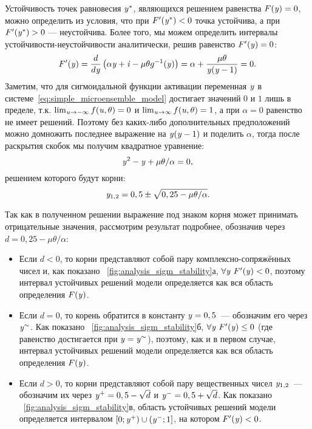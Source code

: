 Устойчивость точек равновесия $\mathit{y}^{*}$, являющихся решением равенства $F(\mathit{y}) = 0$, можно определить из условия, что при $F^{\prime}(\mathit{y}^{*}) < 0$ точка устойчива, а при $F^{\prime}(\mathit{y}^{*}) > 0$ --- неустойчива. Более того, мы можем определить интервалы устойчивости-неустойчивости аналитически, решив равенство $F^{\prime}(\mathit{y}) = 0$:
\begin{equation}
    \nonumber
    F^{\prime}(\mathit{y}) 
    = \dfrac{d}{d\mathit{y}}\left( \alpha \mathit{y} + \mathit{i} - \mu \theta g^{-1}(\mathit{y}) \right) 
    = \alpha + \dfrac{\mu \theta}{\mathit{y}(\mathit{y} - 1)}
    = 0.
\end{equation}
Заметим, что для сигмоидальной функции активации переменная $\mathit{y}$ в системе~\eqref{eq:simple_microensemble_model} достигает значений $0$ и $1$ лишь в пределе, т.к. $\lim_{\mathit{u} \to -\infty} f(\mathit{u}, \theta) = 0$ и $\lim_{\mathit{u} \to \infty} f(\mathit{u}, \theta) = 1$, а при $\alpha = 0$ равенство не имеет решений. Поэтому без каких-либо дополнительных предположений можно домножить последнее выражение на $\mathit{y}(\mathit{y} - 1)$ и поделить $\alpha$, тогда после раскрытия скобок мы получим квадратное уравнение:
\begin{equation}
    \nonumber
    \mathit{y}^{2} - \mathit{y} + \mu \theta / \alpha = 0,
\end{equation}
решением которого будут корни:
\begin{equation}
    \label{eq:sigm_stability_bounds_y}
    \mathit{y}_{1,2} = 0,5 \pm \sqrt{0,25 - \mu \theta / \alpha}.
\end{equation}

Так как в полученном решении выражение под знаком корня может принимать отрицательные значения, рассмотрим результат подробнее, обозначив через $d = 0,25 - \mu \theta / \alpha$:
\begin{itemize}
    \item Если $d < 0$, то корни представляют собой пару комплексно-сопряжённых чисел и, как показано \onfigure~\ref{fig:analysis_sigm_stability}а, $\forall\mathit{y}\ F^{\prime}(\mathit{y}) < 0$, поэтому интервал устойчивых решений модели определяется как вся область определения $F(\mathit{y})$.
    \item Если $d = 0$, то корень обратится в константу $\mathit{y} = 0,5$~--- обозначим его через $\mathit{y}^{\sim}$. Как показано \onfigure~\ref{fig:analysis_sigm_stability}б, $\forall\mathit{y}\ F^{\prime}(\mathit{y}) \le 0$ (где равенство достигается при $\mathit{y} = \mathit{y}^{\sim}$), поэтому, как и в первом случае, интервал устойчивых решений модели определяется как вся область определения $F(\mathit{y})$.
    \item Если $d > 0$, то корни представляют собой пару вещественных чисел $\mathit{y}_{1,2}$~--- обозначим их через $\mathit{y}^{+} = 0,5 - \sqrt{d}$ и $\mathit{y}^{-} = 0,5 + \sqrt{d}$. Как показано \onfigure~\ref{fig:analysis_sigm_stability}в, область устойчивых решений модели определяется интервалом $\left[0; \mathit{y}^{+}\right) \cup \left(\mathit{y}^{-}; 1\right]$, на котором $F^{\prime}(\mathit{y}) < 0$.
\end{itemize}

